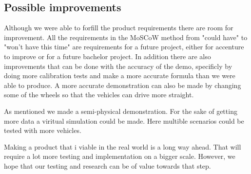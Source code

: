 \subsection{Possible improvements}

Although we were able to forfill the product requirements there are room for improvement. All the requirements in the MoSCoW method from "could have" to "won't have this time" are requirements for a future project, either for accenture to improve or for a future bachelor project. In addition there are also improvements that can be done with the accuracy of the demo, specificly by doing more calibration tests and make a more accurate formula than we were able to produce. A more accurate demonstration can also be made by changing some of the wheels so that the vehicles can drive more straight.

As mentioned we made a semi-physical demonstration. For the sake of getting more data a viritual simulation could be made. Here multible scenarios could be tested with more vehicles.  

Making a product that i viable in the real world is a long way ahead. That will require a lot more testing and implementation on a bigger scale. However, we hope that our testing and research can be of value towards that step.